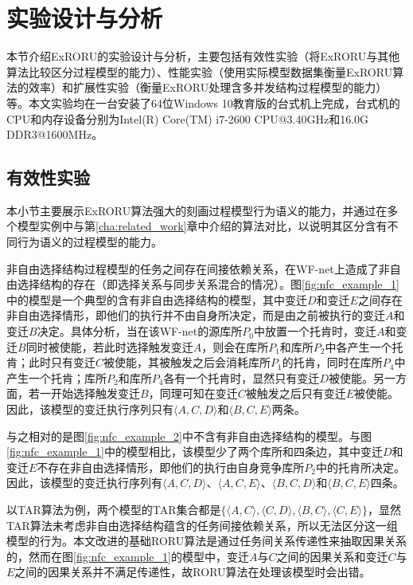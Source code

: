 \section{实验设计与分析}\label{sec:experiment}
本节介绍ExRORU的实验设计与分析，主要包括有效性实验（将ExRORU与其他算法比较区分过程模型的能力）、性能实验（使用实际模型数据集衡量ExRORU算法的效率）和扩展性实验（衡量ExRORU处理含多并发结构过程模型的能力）等。本文实验均在一台安装了64位Windows 10教育版的台式机上完成，台式机的CPU和内存设备分别为Intel(R) Core(TM) i7-2600 CPU@3.40GHz和16.0G DDR3@1600MHz。

\subsection{有效性实验}\label{subsec:effectiveness}
本小节主要展示ExRORU算法强大的刻画过程模型行为语义的能力，并通过在多个模型实例中与第\ref{cha:related_work}章中介绍的算法对比，以说明其区分含有不同行为语义的过程模型的能力。

{\heiti 非自由选择结构\qquad}过程模型的任务之间存在间接依赖关系\cite{van2004workflow,van2003workflow,de2003workflow,van2004process}，在WF-net上造成了非自由选择结构的存在（即选择关系与同步关系混合的情况）。图\ref{fig:nfc_example_1}中的模型是一个典型的含有非自由选择结构的模型，其中变迁$D$和变迁$E$之间存在非自由选择情形，即他们的执行并不由自身所决定，而是由之前被执行的变迁$A$和变迁$B$决定。具体分析，当在该WF-net的源库所$P_{0}$中放置一个托肯时，变迁$A$和变迁$B$同时被使能，若此时选择触发变迁$A$，则会在库所$P_{1}$和库所$P_{2}$中各产生一个托肯；此时只有变迁$C$被使能，其被触发之后会消耗库所$P_{1}$的托肯，同时在库所$P_{4}$中产生一个托肯；库所$P_{2}$和库所$P_{4}$各有一个托肯时，显然只有变迁$D$被使能。另一方面，若一开始选择触发变迁$B$，同理可知在变迁$C$被触发之后只有变迁$E$被使能。因此，该模型的变迁执行序列只有$\langle A,C,D\rangle$和$\langle B,C,E\rangle$两条。

与之相对的是图\ref{fig:nfc_example_2}中不含有非自由选择结构的模型。与图\ref{fig:nfc_example_1}中的模型相比，该模型少了两个库所和四条边，其中变迁$D$和变迁$E$不存在非自由选择情形，即他们的执行由自身竞争库所$P_{2}$中的托肯所决定。因此，该模型的变迁执行序列有$\langle A,C,D\rangle$、$\langle A,C,E\rangle$、$\langle B,C,D\rangle$和$\langle B,C,E\rangle$四条。

以TAR算法为例，两个模型的TAR集合都是$\{\langle A,C\rangle,\langle C,D\rangle,\langle B,C\rangle,\langle C,E\rangle\}$，显然TAR算法未考虑非自由选择结构蕴含的任务间接依赖关系，所以无法区分这一组模型的行为。本文改进的基础RORU算法是通过任务间关系传递性来抽取因果关系的，然而在图\ref{fig:nfc_example_1}的模型中，变迁$A$与$C$之间的因果关系和变迁$C$与$E$之间的因果关系并不满足传递性，故RORU算法在处理该模型时会出错。

